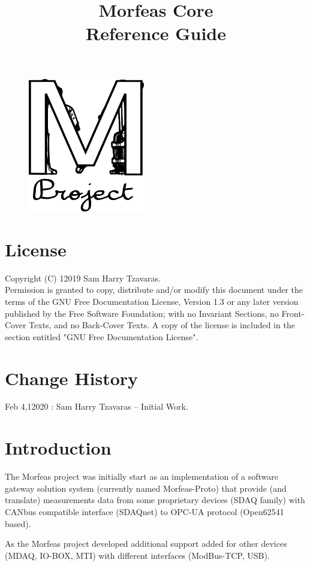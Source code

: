 \documentclass{article}
\title{Morfeas Core\\Reference Guide }
\author{}
\date{}
\begin{document}
\clearpage
\begin{figure}
\centering
  \includegraphics[width=2in]{ArtWork/Morfeas_logo.png}
\end{figure}
\maketitle
\thispagestyle{empty}
\newpage
\section{License}
Copyright (C)  12019  Sam Harry Tzavaras.\\
Permission is granted to copy, distribute and/or modify this document
under the terms of the GNU Free Documentation License, Version 1.3
or any later version published by the Free Software Foundation;
with no Invariant Sections, no Front-Cover Texts, and no Back-Cover Texts.
A copy of the license is included in the section entitled "GNU Free Documentation License".
\section{Change History}
Feb 4,12020 : Sam Harry Tzavaras -- Initial Work.

\newpage
\tableofcontents
\newpage
\section{Introduction}
The Morfeas project was initially start as an implementation of a software gateway solution system
(currently named Morfeas-Proto) that provide (and translate) measurements data from some proprietary devices (SDAQ family)
with CANbus compatible interface (SDAQnet) to OPC-UA protocol (Open62541 based).

As the Morfeas project developed additional support added for other devices (MDAQ, IO-BOX, MTI) with different interfaces (ModBus-TCP, USB).
\end{document}
